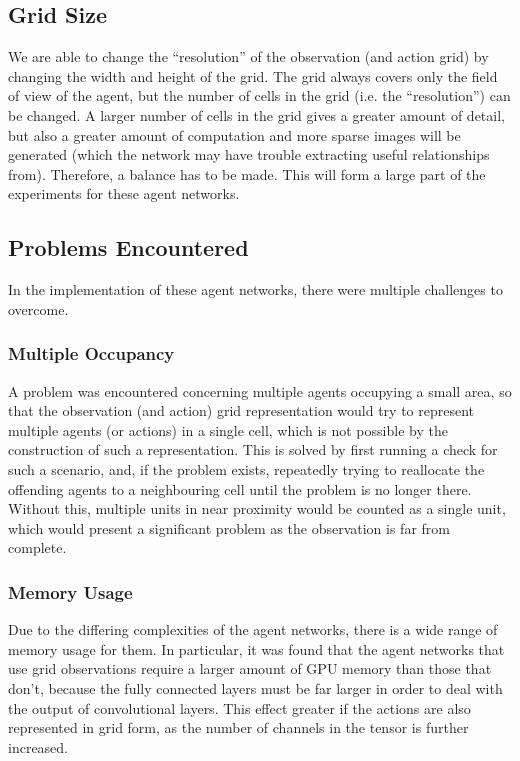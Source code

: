 \subsection{Grid Size}

We are able to change the ``resolution'' of the observation (and action grid) by changing the width and height of the grid. The grid always covers only the field of view of the agent, but the number of cells in the grid (i.e. the ``resolution'') can be changed.  A larger number of cells in the grid gives a greater amount of detail, but also a greater amount of computation and more sparse images will be generated (which the network may have trouble extracting useful relationships from). Therefore, a balance has to be made. This will form a large part of the experiments for these agent networks.





\subsection{Problems Encountered}
In the implementation of these agent networks, there were multiple challenges to overcome.

\subsubsection{Multiple Occupancy}
A problem was encountered concerning multiple agents occupying a small area, so that the observation (and action) grid representation would try to represent multiple agents (or actions) in a single cell, which is not possible by the construction of such a representation. This is solved by first running a check for such a scenario, and, if the problem exists, repeatedly trying to reallocate the offending agents to a neighbouring cell until the problem is no longer there. Without this, multiple units in near proximity would be counted as a single unit, which would present a significant problem as the observation is far from complete. 

\subsubsection{Memory Usage}
Due to the differing complexities of the agent networks, there is a wide range of memory usage for them. In particular, it was found that the agent networks that use grid observations require a larger amount of GPU memory than those that don't, because the fully connected layers must be far larger in order to deal with the output of convolutional layers. This effect greater if the actions are also represented in grid form, as the number of channels in the tensor is further increased. 

